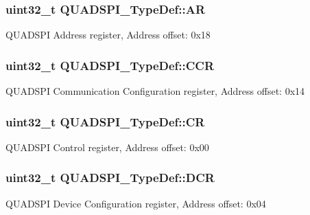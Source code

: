 \subsubsection[{\texorpdfstring{AR}{AR}}]{ uint32\+\_\+t Q\+U\+A\+D\+S\+P\+I\+\_\+\+Type\+Def\+::\+AR}\hypertarget{struct_q_u_a_d_s_p_i___type_def_abf9f879cef8fff9883f1654f3cd14125}{}\label{struct_q_u_a_d_s_p_i___type_def_abf9f879cef8fff9883f1654f3cd14125}
Q\+U\+A\+D\+S\+PI Address register, Address offset\+: 0x18 
\subsubsection[{\texorpdfstring{C\+CR}{CCR}}]{ uint32\+\_\+t Q\+U\+A\+D\+S\+P\+I\+\_\+\+Type\+Def\+::\+C\+CR}\hypertarget{struct_q_u_a_d_s_p_i___type_def_aa2e69474978a87b7a24b4b0e4da3c673}{}\label{struct_q_u_a_d_s_p_i___type_def_aa2e69474978a87b7a24b4b0e4da3c673}
Q\+U\+A\+D\+S\+PI Communication Configuration register, Address offset\+: 0x14 
\subsubsection[{\texorpdfstring{CR}{CR}}]{ uint32\+\_\+t Q\+U\+A\+D\+S\+P\+I\+\_\+\+Type\+Def\+::\+CR}\hypertarget{struct_q_u_a_d_s_p_i___type_def_ad6a1c5cd7b36de02e3969fb9c469beea}{}\label{struct_q_u_a_d_s_p_i___type_def_ad6a1c5cd7b36de02e3969fb9c469beea}
Q\+U\+A\+D\+S\+PI Control register, Address offset\+: 0x00 
\subsubsection[{\texorpdfstring{D\+CR}{DCR}}]{ uint32\+\_\+t Q\+U\+A\+D\+S\+P\+I\+\_\+\+Type\+Def\+::\+D\+CR}\hypertarget{struct_q_u_a_d_s_p_i___type_def_a8901a4df6a4d50b741c4544290cbee04}{}\label{struct_q_u_a_d_s_p_i___type_def_a8901a4df6a4d50b741c4544290cbee04}
Q\+U\+A\+D\+S\+PI Device Configuration register, Address offset\+: 0x04 
